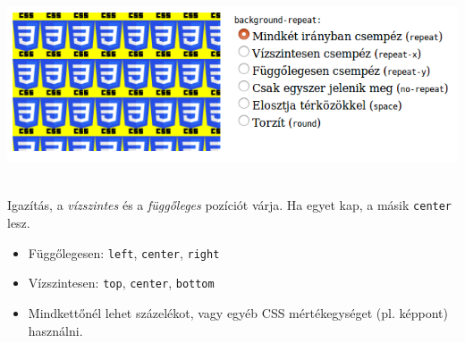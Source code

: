 \begin{frame}
  \begin{center}
    \includegraphics[width=.75\textwidth]{hatter.png}\\
  \end{center}
\end{frame}

\begin{frame}
  \begin{description}[m]
    \item[\texttt{background-position}] \hfill \\ Igazítás, a 
      \emph{vízszintes} és a \emph{függőleges} pozíciót várja. Ha egyet 
      kap, a másik \texttt{center} lesz.
      \begin{itemize}
        \item Függőlegesen: \texttt{left}, \texttt{center}, 
        \texttt{right}
        \item Vízszintesen: \texttt{top}, \texttt{center}, 
        \texttt{bottom}
        \item Mindkettőnél lehet százelékot, vagy egyéb CSS 
        mértékegységet (pl. képpont) használni. 
      \end{itemize}
  \end{description}
\end{frame}

\begin{frame}
  \begin{exampleblock}{}
    \fontsize{7}{8} \selectfont
    
    
    
    
    
  \end{exampleblock}
\end{frame}

